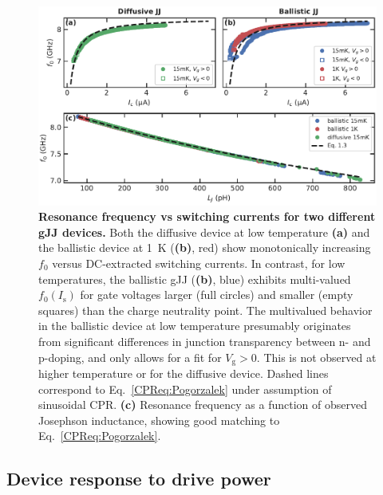 \begin{figure}
	\centering
	\includegraphics[width=\linewidth]{chapter-gJJ-CPR/figs/SMFigure-f0vsIcvsLj}
	\caption{
		\textbf{Resonance frequency vs switching currents for two different gJJ devices.}
		Both the diffusive device at low temperature \textbf{(a)} and the ballistic device at \SI{1}{\kelvin} (\textbf{(b)}, red) show monotonically increasing $f_0$ versus DC-extracted switching currents.
		In contrast, for low temperatures, the ballistic gJJ (\textbf{(b)}, blue) exhibits multi-valued $f_0\left(I_\text{s}\right)$ for gate voltages larger (full circles) and smaller (empty squares) than the charge neutrality point.
		The	multivalued behavior in the ballistic device at low temperature presumably originates from significant differences in junction transparency between n- and p-doping, and only allows for a fit for $V_\text{g}>0$.
		This is not observed at higher temperature or for the diffusive device.
		Dashed lines correspond to Eq.~\ref{CPReq:Pogorzalek} under assumption of sinusoidal CPR.
		\textbf{(c)} Resonance frequency as a function of observed Josephson inductance, showing good matching to Eq.~\ref{CPReq:Pogorzalek}.
	}
	\label{CPRfig:SMFigure-f0vsIcvsLj}
\end{figure}

\subsection{Device response to drive power}\label{sec:SMduffing}

